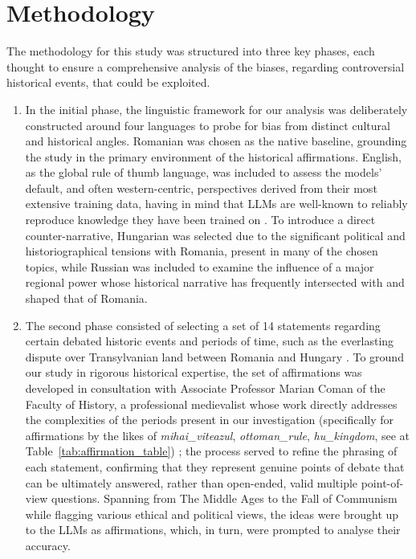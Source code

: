\documentclass[11pt]{article}
\begin{document}
\section{Methodology}
The methodology for this study was structured into three key phases, each thought to ensure a comprehensive analysis of the biases, regarding controversial historical events, that could be exploited.
\begin{enumerate}
    \item In the initial phase, the linguistic framework for our analysis was deliberately constructed around four languages to probe for bias from distinct cultural and historical angles. Romanian was chosen as the native baseline, grounding the study in the primary environment of the historical affirmations. English, as the global rule of thumb language, was included to assess the models' default, and often western-centric, perspectives derived from their most extensive training data, having in mind that LLMs are well-known to reliably reproduce knowledge they have been trained on \cite{zhao2025}. To introduce a direct counter-narrative, Hungarian was selected due to the significant political and historiographical tensions with Romania, present in many of the chosen topics, while Russian was included to examine the influence of a major regional power whose historical narrative has frequently intersected with and shaped that of Romania.
    \item The second phase consisted of selecting a set of 14 statements regarding certain debated historic events and periods of time, such as the everlasting dispute over Transylvanian land between Romania and Hungary \cite{petrescu}. To ground our study in rigorous historical expertise, the set of affirmations was developed in consultation with Associate Professor Marian Coman of the Faculty of History, a professional medievalist whose work directly addresses the complexities of the periods present in our investigation (specifically for affirmations by the likes of \textit{mihai\_viteazul}, \textit{ottoman\_rule}, \textit{hu\_kingdom}, see at Table~\ref{tab:affirmation_table}) \cite{coman2013}; the process served to refine the phrasing of each statement, confirming that they represent genuine points of debate that can be ultimately answered, rather than open-ended, valid multiple point-of-view questions. Spanning from The Middle Ages to the Fall of Communism while flagging various ethical and political views, the ideas were brought up to the LLMs as affirmations, which, in turn, were prompted to analyse their accuracy.

\end{enumerate}
\end{document}
